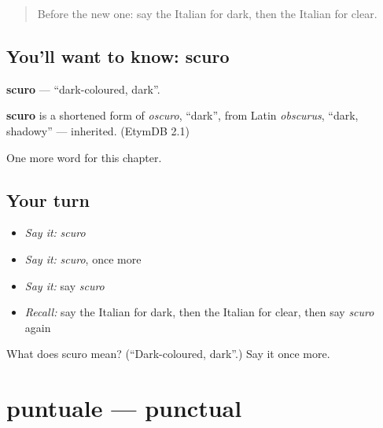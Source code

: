 \label{lesson:IT-C158-scuro}



\begin{quote}
Before the new one: say the Italian for dark, then the Italian for clear.
\end{quote}

\subsection*{You'll want to know: scuro}
\textbf{scuro} — \textquotedblleft{}dark-coloured, dark\textquotedblright{}.

\begin{cousinweb}
\textbf{scuro} is a shortened form of \emph{oscuro}, \textquotedblleft{}dark\textquotedblright{}, from Latin \emph{obscurus}, \textquotedblleft{}dark, shadowy\textquotedblright{} — inherited. (EtymDB 2.1)
\end{cousinweb}

\begin{grammarlens}[title={What you've built}]
One more word for this chapter.
\end{grammarlens}

\subsection*{Your turn}
\begin{itemize}
\raggedright
  \item \emph{Say it:} \emph{scuro}
  \item \emph{Say it:} \emph{scuro}, once more
  \item \emph{Say it:} say \emph{scuro}
  \item \emph{Recall:} say the Italian for dark, then the Italian for clear, then say \emph{scuro} again
\end{itemize}

\begin{tcolorbox}[breakable,colback=teal!4,colframe=teal!35!black,title={Before you move on}]
What does scuro mean? (\textquotedblleft{}Dark-coloured, dark\textquotedblright{}.) Say it once more.
\end{tcolorbox}
\section[puntuale]{puntuale — punctual}

\label{lesson:IT-C158-puntuale}



